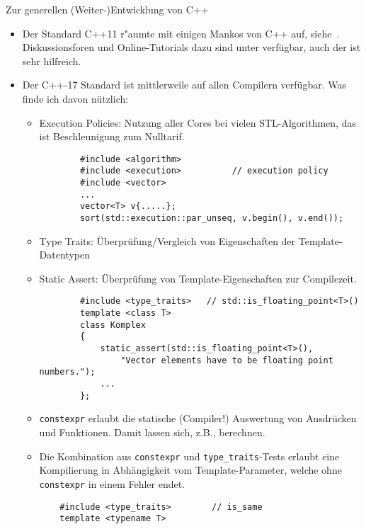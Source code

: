 Zur generellen (Weiter-)Entwicklung von C++
\begin{itemize}
  \item Der Standard C++11 r"aumte mit einigen Mankos von C++ auf, 
  siehe~\cite{Grimm:2011:CLP,Will:2012:CPT}. 
  Diskussionsforen und Online-Tutorials dazu sind unter
   verfügbar, 
  auch der  ist sehr hilfreich.
  \item Der C++-17 Standard ist mittlerweile auf allen Compilern verfügbar. 
  Was finde ich davon nützlich:
  \begin{itemize}
  \item Execution Policies: Nutzung aller Cores bei vielen STL-Algorithmen, 
  das ist Beschleunigung zum Nulltarif.
  \begin{verbatim}
        #include <algorithm>
        #include <execution>          // execution policy
        #include <vector>
        ...
        vector<T> v{.....};
        sort(std::execution::par_unseq, v.begin(), v.end());
  \end{verbatim}
  \item Type Traits: Überprüfung/Vergleich von Eigenschaften der Template-Datentypen
  \item Static Assert: Überprüfung von Template-Eigenschaften zur Compilezeit.
  \begin{verbatim}
        #include <type_traits>   // std::is_floating_point<T>()
        template <class T>
        class Komplex
        {
            static_assert(std::is_floating_point<T>(),
                "Vector elements have to be floating point numbers.");
            ...
        };
  \end{verbatim}
  \item \texttt{constexpr} erlaubt die statische (Compiler!) Auswertung von 
  Ausdrücken und Funktionen. 
  Damit lassen sich, z.B., 
  berechnen. \\
  \item Die Kombination aus \texttt{constexpr} und \texttt{type\_traits}-Tests 
  erlaubt eine Kompilierung in Abhängigkeit vom Template-Parameter, welche ohne 
  \texttt{constexpr} in einem Fehler endet.
  \small{
   \begin{verbatim}
    #include <type_traits>        // is_same
    template <typename T>

\end{verbatim}}
\end{itemize}
\end{itemize}
